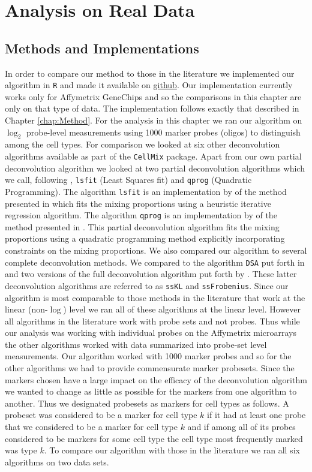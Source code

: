 \documentclass[reqno,12pt,oneside]{report}\usepackage[]{graphicx}\usepackage[]{color}
\theoremstyle{plain}
\theoremstyle{definition}
\theoremstyle{remark}
\numberwithin{theorem}{chapter}     %
\begin{document}
 \chapter{Analysis on Real Data}
 \label{chap:Analysis}


\section{Methods and Implementations}
In order to compare our method to those in the literature we implemented our algorithm in \verb+R+ and made it available on \href{https://github.com/gjhunt/deconvolution}{github}. Our implementation currently works only for Affymetrix GeneChips and so the comparisons in this chapter are only on that type of data. The implementation follows exactly that described in Chapter \ref{chap:Method}. For the analysis in this chapter we ran our algorithm on $\log_2$ probe-level measurements using 1000 marker probes (oligos) to distinguish among the cell types. For comparison we looked at six other deconvolution algorithms available as part of the \verb+CellMix+ package. Apart from our own partial deconvolution algorithm we looked at two partial deconvolution algorithms which we call, following \citeauthor{Gaujoux2013}, \verb+lsfit+ (Least Squares fit) and \verb+qprog+ (Quadratic Programming). The algorithm \verb+lsfit+ is an implementation by \citeauthor{Gaujoux2013} of the method presented in \cite{Abbas2009} which fits the mixing proportions using a heuristic iterative regression algorithm. The algorithm \verb+qprog+ is an implementation by \citeauthor{Gaujoux2013} of the method presented in \cite{Gong2011}. This partial deconvolution algorithm fits the mixing proportions using a quadratic programming method explicitly incorporating constraints on the mixing proportions. We also compared our algorithm to several complete deconvolution methods. We compared to the algorithm \verb+DSA+ put forth in \cite{Zhong2013} and two versions of the full deconvolution algorithm put forth by \cite{Gaujoux2012}. These latter deconvolution algorithms are referred to as \verb+ssKL+ and \verb+ssFrobenius+. Since our algorithm is most comparable to those methods in the literature that work at the linear (non-$\log$) level we ran all of these algorithms at the linear level. However all algorithms in the literature work with probe sets and not probes. Thus while our analysis was working with individual probes on the Affymetrix microarrays the other algorithms worked with data summarized into probe-set level measurements. Our algorithm worked with 1000 marker probes and so for the other algorithms we had to provide commensurate marker probesets. Since the markers chosen have a large impact on the efficacy of the deconvolution algorithm we wanted to change as little as possible for the markers from one algorithm to another. Thus we designated probesets as markers for cell types as follows. A probeset was considered to be a marker for cell type $k$ if it had at least one probe that we considered to be a marker for cell type $k$ and if among all of its probes considered to be markers for some cell type the cell type most frequently marked was type $k$. To compare our algorithm with those in the literature we ran all six algorithms on two data sets. 
\end{document}
